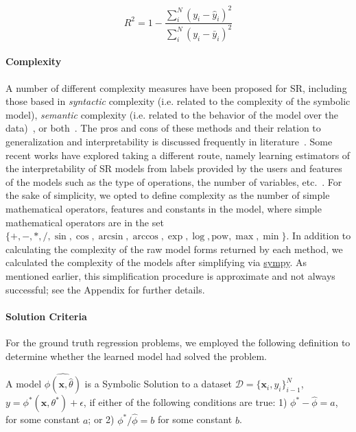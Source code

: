 \begin{equation}
    R^2 = 1 - \frac{\sum_i^N{(y_i - \hat{y}_i)^2}}
                   {\sum_i^N{(y_i - \bar{y}_i)^2}}
\end{equation}

\paragraph{Complexity}
A number of different complexity measures have been proposed for SR, including those based in \textit{syntactic} complexity (i.e. related to the complexity of the symbolic model), \textit{semantic} complexity (i.e. related to the behavior of the model over the data)~\cite{vladislavlevaOrderNonlinearityComplexity2009a,udrescuAIFeynmanParetooptimal2020}, or both~\cite{kommendamichaelEvolvingSimpleSymbolic2015}. 
The pros and cons of these methods and their relation to generalization and interpretability is discussed frequently in literature~\cite{murdochDefinitionsMethodsApplications2019}. 
Some recent works have explored taking a different route, namely learning estimators of the interpretability of SR models from labels provided by the users and features of the models such as the type of operations, the number of variables, etc.~\cite{virgolinLearningAFormula2020,virgolinModelLearning2021}.
For the sake of simplicity, we opted to define complexity as the number of simple mathematical operators, features and constants in the model, where simple mathematical operators are in the set 
$\{+,
    -,
    *,
    {/},
    \sin,
    \cos,
    \arcsin,
    \arccos,
    \exp,
    \log, 
\text{pow},
\max,
\min \}$. 
In addition to calculating the complexity of the raw model forms returned by each method, we calculated the complexity of the models after simplifying via \href{https://www.sympy.org/en/index.html}{sympy}.
As mentioned earlier, this simplification procedure is approximate and not always successful; see the Appendix for further details. 

\paragraph{Solution Criteria}
For the ground truth regression problems, we employed the following definition to determine whether the learned model had solved the problem.

\begin{definition}
A model $\hat{\phi(\mathbf{x}, \hat{\theta})}$ is a Symbolic Solution to a dataset $\mathcal{D} = \{\mathbf{x}_i, y_i\}_{i-1}^N$, $y = \phi^*(\mathbf{x}, \theta^*) + \epsilon$, if either of the following conditions are true: 1) $\phi^*-\hat{\phi} = a $, for some constant $a$; or 2) $\phi^*/\hat{\phi} = b $ for some constant $b$.
\end{definition}

